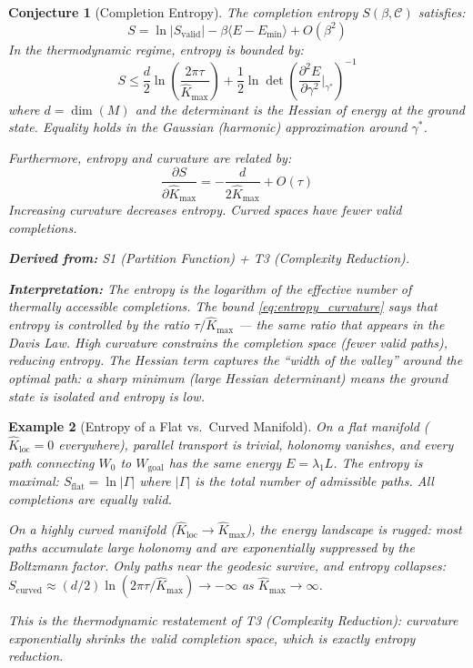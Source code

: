\documentclass[11pt,letterpaper]{article}
\newtheorem{conjecture}{Conjecture}[section]
\newtheorem{example}[conjecture]{Example}
\newcommand{\Khat}{\hat{K}}
\newcommand{\Svalid}{S_{\mathrm{valid}}}
\begin{document}
\begin{conjecture}[Completion Entropy]\label{conj:entropy}
The completion entropy $S(\beta, \mathcal{C})$ satisfies:
\begin{equation}\label{eq:entropy_bound}
    S = \ln |\Svalid| - \beta \langle E - E_{\min} \rangle + O(\beta^2)
\end{equation}
In the thermodynamic regime, entropy is bounded by:
\begin{equation}\label{eq:entropy_curvature}
    S \leq \frac{d}{2} \ln\left(\frac{2\pi \tau}{\Khat_{\max}}\right) 
    + \frac{1}{2}\ln \det\left(\frac{\partial^2 E}{\partial \gamma^2}
    \bigg|_{\gamma^*}\right)^{-1}
\end{equation}
where $d = \dim(M)$ and the determinant is the Hessian of energy at the 
ground state. Equality holds in the Gaussian (harmonic) approximation 
around $\gamma^*$.

Furthermore, entropy and curvature are related by:
\begin{equation}\label{eq:entropy_curvature_relation}
    \frac{\partial S}{\partial \Khat_{\max}} = -\frac{d}{2\Khat_{\max}} 
    + O(\tau)
\end{equation}
Increasing curvature decreases entropy. Curved spaces have fewer valid 
completions.

\textbf{Derived from:} S1 (Partition Function) + T3 (Complexity Reduction).

\textbf{Interpretation:} The entropy is the logarithm of the effective 
number of thermally accessible completions. The bound \eqref{eq:entropy_curvature} 
says that entropy is controlled by the ratio $\tau / \Khat_{\max}$ --- the 
same ratio that appears in the Davis Law. High curvature constrains the 
completion space (fewer valid paths), reducing entropy. The Hessian term 
captures the ``width of the valley'' around the optimal path: a sharp 
minimum (large Hessian determinant) means the ground state is isolated 
and entropy is low.
\end{conjecture}

\begin{example}[Entropy of a Flat vs.\ Curved Manifold]
On a flat manifold ($\Khat_{\mathrm{loc}} = 0$ everywhere), parallel 
transport is trivial, holonomy vanishes, and every path connecting 
$W_0$ to $W_{\mathrm{goal}}$ has the same energy $E = \lambda_1 L$. 
The entropy is maximal: $S_{\mathrm{flat}} = \ln |\Gamma|$ where $|\Gamma|$ 
is the total number of admissible paths. All completions are equally valid.

On a highly curved manifold ($\Khat_{\mathrm{loc}} \to \Khat_{\max}$), 
the energy landscape is rugged: most paths accumulate large holonomy and 
are exponentially suppressed by the Boltzmann factor. Only paths near 
the geodesic survive, and entropy collapses: 
$S_{\mathrm{curved}} \approx (d/2) \ln(2\pi\tau / \Khat_{\max}) \to -\infty$ 
as $\Khat_{\max} \to \infty$.

This is the thermodynamic restatement of T3 (Complexity Reduction): 
curvature exponentially shrinks the valid completion space, which is 
exactly entropy reduction.
\end{example}
\end{document}
